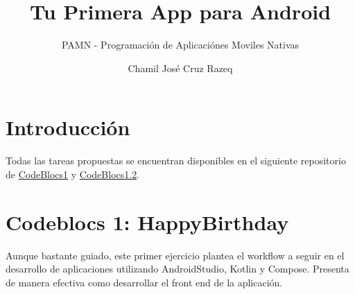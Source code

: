 \documentclass{scrartcl}
\title{Tu Primera App para Android}
\subtitle{\large PAMN - Programación de Aplicaciónes Moviles Nativas}
\author{Chamil José Cruz Razeq}
\begin{document}
    \maketitle
    \thispagestyle{empty}
    \newpage

    \section{Introducción}
        Todas las tareas propuestas se encuentran disponibles en el siguiente
         repositorio de \href{https://github.com/chamilstudy/ulpgc_pamn_codeblocs1}{CodeBlocs1} y \href{https://github.com/chamilstudy/ulpgc_pamn_codeblocs1.2}{CodeBlocs1.2}.

    \section{Codeblocs 1: HappyBirthday}
        Aunque bastante guiado, este primer ejercicio plantea el workflow a seguir en el desarrollo
        de aplicaciones utilizando AndroidStudio, Kotlin y Compose. Presenta de manera efectiva como
        desarrollar el front end de la aplicación.
\end{document}
